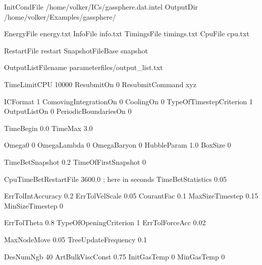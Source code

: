 
InitCondFile  	  /home/volker/ICs/gassphere.dat.intel
OutputDir         /home/volker/Examples/gassphere/

EnergyFile        energy.txt
InfoFile          info.txt
TimingsFile       timings.txt
CpuFile           cpu.txt

RestartFile       restart
SnapshotFileBase  snapshot

OutputListFilename    parameterfiles/output_list.txt


TimeLimitCPU      10000       
ResubmitOn        0
ResubmitCommand   xyz



ICFormat                 1
ComovingIntegrationOn    0
CoolingOn                0
TypeOfTimestepCriterion  1
OutputListOn             0
PeriodicBoundariesOn     0



TimeBegin           0.0
TimeMax	            3.0

Omega0	              0
OmegaLambda           0
OmegaBaryon           0
HubbleParam         1.0
BoxSize               0



TimeBetSnapshot        0.2
TimeOfFirstSnapshot    0

CpuTimeBetRestartFile     3600.0    ; here in seconds
TimeBetStatistics         0.05



ErrTolIntAccuracy      0.2      %
ErrTolVelScale         0.05     %
CourantFac             0.1      %
MaxSizeTimestep        0.15 
MinSizeTimestep        0



ErrTolTheta            0.8            
TypeOfOpeningCriterion 1
ErrTolForceAcc         0.02

MaxNodeMove            0.05
TreeUpdateFrequency    0.1





DesNumNgb              40
ArtBulkViscConst       0.75
InitGasTemp            0          %
MinGasTemp             0    



